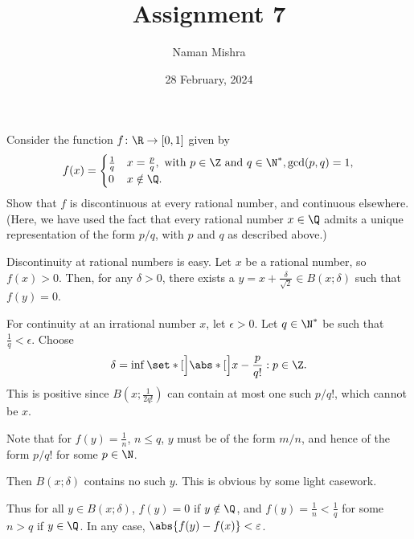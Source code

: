 \documentclass[12pt]{article}
\title      {Assignment 7}
\author{Naman Mishra}
\date{28 February, 2024}
\begin{document}
\maketitle
\begin{problem*}
    Consider the function $f\colon \R \to [0, 1]$ given by \[
        f(x) = \begin{cases}
            \frac1q & x = \frac{p}{q}, \text{ with } p \in \Z \text{ and }
                q \in \N^*, \gcd(p, q) = 1, \\
            0 & x \notin \Q.
        \end{cases}
    \] Show that $f$ is discontinuous at every rational number,
    and continuous elsewhere.
    (Here, we have used the fact that every rational number $x \in \Q$
    admits a unique representation of the form $p/q$,
    with $p$ and $q$ as described above.)
\end{problem*}
\begin{solution}
    Discontinuity at rational numbers is easy.
    Let $x$ be a rational number, so $f(x) > 0$.
    Then, for any $\delta > 0$, there exists a
    $y = x + \frac{\delta}{\sqrt 2} \in B(x; \delta)$
    such that $f(y) = 0$.

    For continuity at an irrational number $x$, let $\epsilon > 0$.
    Let $q \in \N^*$ be such that $\frac1q < \epsilon$.
    Choose \[
        \delta = \inf\set*[\Big]{\abs*[\Big]{x - \frac{p}{q!}} : p \in \Z}.
    \] This is positive since $B(x; \frac1{2q!})$ can contain at most one
    such $p/q!$, which cannot be $x$.

    Note that for $f(y) = \frac1n$, $n \le q$, $y$ must be of the form
    $m/n$, and hence of the form $p/q!$ for some $p \in \N$.

    Then $B(x; \delta)$ contains no such $y$.
    This is obvious by some light casework.

    Thus for all $y \in B(x; \delta)$, $f(y) = 0$ if $y \notin \Q$, and
    $f(y) = \frac1n < \frac1q$ for some $n > q$ if $y \in \Q$.
    In any case, $\abs{f(y) - f(x)} < \varepsilon$.
\end{solution}
\end{document}
